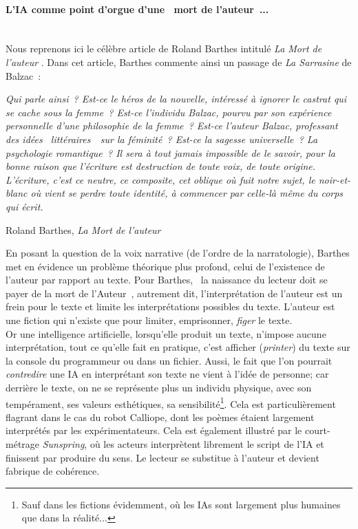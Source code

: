 \documentclass{article}
\newcommand{\subsubsubsection}[1]{\paragraph{#1}\mbox{}\\}
\newenvironment{citationbox}
{\begin{center}
		\begin{minipage}{.8\textwidth}
		}
		{
		\end{minipage}	
\end{center}
}
\begin{document}
				\subsubsubsection{L'IA comme point d'orgue d'une \guillemotleft~mort de l'auteur~\guillemotright...}
					Nous reprenons ici le célèbre article de Roland Barthes intitulé \textit{La Mort de l'auteur} \autocite{barthes1968}. Dans cet article, Barthes commente ainsi un passage de \textit{La Sarrasine} de Balzac~:
					\begin{citationbox}
						\textit{Qui parle ainsi~? Est-ce
						le héros de la nouvelle, intéressé à ignorer le castrat qui se cache sous la femme~? Est-ce l'individu
						Balzac, pourvu par son expérience personnelle d'une philosophie de la femme~? Est-ce l'auteur
						Balzac, professant des idées \guillemotleft~littéraires~\guillemotright~sur la féminité~? Est-ce la sagesse universelle~? La psychologie romantique~? Il sera à tout jamais impossible de le savoir, pour la bonne raison que l'écriture est destruction de toute voix, de toute origine. L'écriture, c'est ce neutre, ce composite, cet
						oblique où fuit notre sujet, le noir-et-blanc où vient se perdre toute identité, à commencer par
						celle-là même du corps qui écrit.}
						\begin{flushright}
							Roland Barthes, \textit{La Mort de l'auteur} \autocite{barthes1968}
						\end{flushright}
					\end{citationbox}
					En posant la question de la voix narrative (de l'ordre de la narratologie), Barthes met en évidence un problème théorique plus profond, celui de l'existence de l'auteur par rapport au texte. Pour Barthes, \guillemotleft~la naissance du lecteur doit se payer de la mort de l'Auteur~\guillemotright, autrement dit, l'interprétation de l'auteur est un frein pour le texte et limite les interprétations possibles du texte. L'auteur est une fiction qui n'existe que pour limiter, emprisonner, \textit{figer} le texte.\\
					Or une intelligence artificielle, lorsqu'elle produit un texte, n'impose aucune interprétation, tout ce qu'elle fait en pratique, c'est afficher (\textit{printer}) du texte sur la console du programmeur ou dans un fichier. Aussi, le fait que l'on pourrait \textit{contredire} une IA en interprétant son texte ne vient à l'idée de personne; car derrière le texte, on ne se représente plus un individu physique, avec son tempérament, ses valeurs esthétiques, sa sensibilité\footnote{Sauf dans les fictions évidemment, où les IAs sont largement plus humaines que dans la réalité...}. Cela est particulièrement flagrant dans le cas du robot Calliope, dont les poèmes étaient largement interprétés par les expérimentateurs. Cela est également illustré par le court-métrage \textit{Sunspring}, où les acteurs interprètent librement le script de l'IA et finissent par produire du sens. Le lecteur se substitue à l'auteur et devient fabrique de cohérence.\\
					
\end{document}
